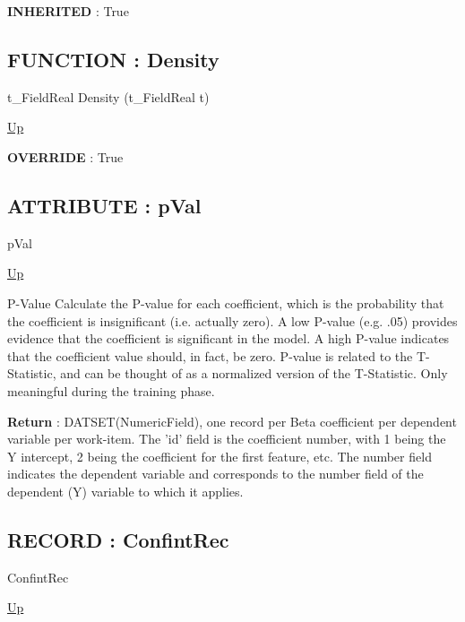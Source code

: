 \par
\par
\textbf{INHERITED} : True \\
\subsection*{FUNCTION : Density}
\hypertarget{ecldoc:linearregression.ols.normaldistribution.density}{}
\begin{minipage}[t]{\textwidth}
\begin{flushleft}
t\_FieldReal Density (t\_FieldReal t)
\end{flushleft}
\end{minipage}
\hyperlink{ecldoc:linearregression.ols.normaldistribution}{Up}

\par
\par
\textbf{OVERRIDE} : True \\

\subsection*{ATTRIBUTE : pVal}
\hypertarget{ecldoc:linearregression.ols.pval}{}
\begin{minipage}[t]{\textwidth}
\begin{flushleft}
 pVal 
\end{flushleft}
\end{minipage}
\hyperlink{ecldoc:linearregression.ols}{Up}

\par
P-Value Calculate the P-value for each coefficient, which is the probability that the coefficient is insignificant (i.e. actually zero). A low P-value (e.g. .05) provides evidence that the coefficient is significant in the model. A high P-value indicates that the coefficient value should, in fact, be zero. P-value is related to the T-Statistic, and can be thought of as a normalized version of the T-Statistic. Only meaningful during the training phase.
\par
\textbf{Return} : DATSET(NumericField), one record per Beta coefficient per dependent variable per work-item. The 'id' field is the coefficient number, with 1 being the Y intercept, 2 being the coefficient for the first feature, etc. The number field indicates the dependent variable and corresponds to the number field of the dependent (Y) variable to which it applies. \\
\subsection*{RECORD : ConfintRec}
\hypertarget{ecldoc:linearregression.ols.confintrec}{}
\begin{minipage}[t]{\textwidth}
\begin{flushleft}
 ConfintRec 
\end{flushleft}
\end{minipage}
\hyperlink{ecldoc:linearregression.ols}{Up}

